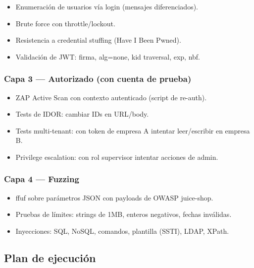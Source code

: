 \documentclass[12pt,a4paper,oneside]{article}
\begin{document}
\begin{itemize}[leftmargin=*]
  \item Enumeración de usuarios vía login (mensajes diferenciados).
  \item Brute force con throttle/lockout.
  \item Resistencia a credential stuffing (Have I Been Pwned).
  \item Validación de JWT: firma, alg=none, kid traversal, exp, nbf.
\end{itemize}

\subsubsection{Capa 3 — Autorizado (con cuenta de prueba)}

\begin{itemize}[leftmargin=*]
  \item ZAP Active Scan con contexto autenticado (script de re-auth).
  \item Tests de IDOR: cambiar IDs en URL/body.
  \item Tests multi-tenant: con token de empresa A intentar leer/escribir en empresa B.
  \item Privilege escalation: con rol supervisor intentar acciones de admin.
\end{itemize}

\subsubsection{Capa 4 — Fuzzing}

\begin{itemize}[leftmargin=*]
  \item ffuf sobre parámetros JSON con payloads de OWASP juice-shop.
  \item Pruebas de límites: strings de 1MB, enteros negativos, fechas inválidas.
  \item Inyecciones: SQL, NoSQL, comandos, plantilla (SSTI), LDAP, XPath.
\end{itemize}

\subsection{Plan de ejecución}
\end{document}
